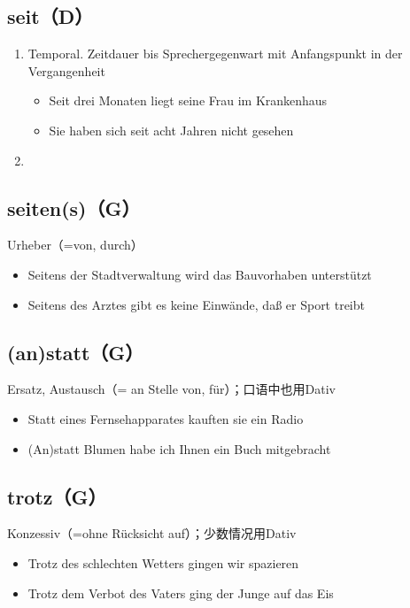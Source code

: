 \documentclass[UTF8]{report}
\begin{document}
\subsection{seit（D）}
\begin{enumerate}
    \item Temporal. Zeitdauer bis Sprechergegenwart mit Anfangspunkt in der Vergangenheit
    \begin{itemize}
        \item Seit drei Monaten liegt seine Frau im Krankenhaus
        \item Sie haben sich seit acht Jahren nicht gesehen
    \end{itemize}
    \item 
\end{enumerate}

\subsection{seiten(s)（G）}
Urheber（=von, durch）

\begin{itemize}
    \item Seitens der Stadtverwaltung wird das Bauvorhaben unterstützt
    \item Seitens des Arztes gibt es keine Einwände, daß er Sport treibt
\end{itemize}

\subsection{(an)statt（G）}
Ersatz, Austausch（= an Stelle von, für）；口语中也用Dativ
\begin{itemize}
    \item Statt eines Fernsehapparates kauften sie ein Radio
    \item (An)statt Blumen habe ich Ihnen ein Buch mitgebracht
\end{itemize}



\subsection{trotz（G）}
Konzessiv（=ohne Rücksicht auf）；少数情况用Dativ
\begin{itemize}
    \item Trotz des schlechten Wetters gingen wir spazieren
    \item Trotz dem Verbot des Vaters ging der Junge auf das Eis
\end{itemize}
\end{document}
